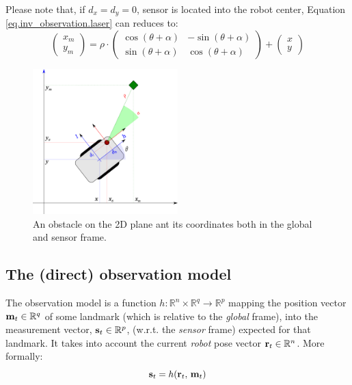 		Please note that, if $d_x = d_y = 0$, \ie{} sensor is located into the robot center, Equation \ref{eq.inv_observation.laser} can reduces to:
		\[
			\left(\begin{array}{c}
				x_m \\ y_m
			\end{array}\right)
			=
			\rho \cdot
			\left(\begin{array}{ccc}
				\cos{(\theta + \alpha)} & -\sin{(\theta + \alpha)} \\
				\sin{(\theta + \alpha)} & \cos{(\theta + \alpha)}
			\end{array}\right)
			+
			\left(\begin{array}{c}
				x \\ y
			\end{array}\right)
		\]
		
		\begin{figure}
			\centering
			\includegraphics[width=0.5\textwidth]{./img/observation.pdf}
			\caption{An obstacle on the 2D plane ant its coordinates both in the global and sensor frame.}
			\label{fig.observation}
		\end{figure}
		
\subsection{The (direct) observation model}
	The observation model is a function $h : \mathbb{R}^n \times \mathbb{R}^q \rightarrow \mathbb{R}^p$ mapping the position vector $\boldsymbol{\mathrm{{m}}}_t \in \mathbb{R}^q$ of some landmark (which is relative to the \emph{global} frame), into the measurement vector, $\boldsymbol{\mathrm{{s}}}_{t} \in \mathbb{R}^p$, (w.r.t. the \emph{sensor} frame) expected for that landmark. 
	It takes into account the current \emph{robot} pose vector $\boldsymbol{\mathrm{{r}}}_t \in \mathbb{R}^n$.
	More formally:
	\[
		\boldsymbol{\mathrm{{s}}}_t = h(\boldsymbol{\mathrm{{r}}}_{t},\, \boldsymbol{\mathrm{{m}}}_t)
	\]
	

